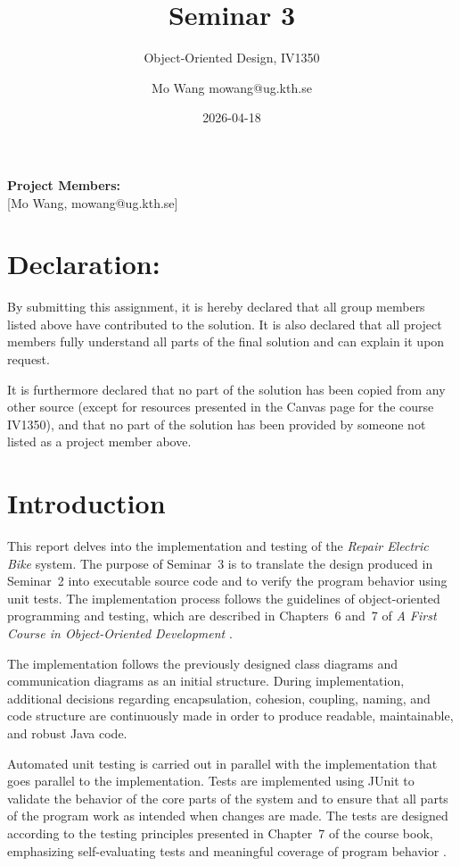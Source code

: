 \documentclass[a4paper]{scrartcl}
\title{Seminar 3}
\subtitle{Object-Oriented Design, IV1350}
\author{Mo Wang mowang@ug.kth.se}
\date{2026-04-18}
\begin{document}
\maketitle
\noindent\textbf{Project Members:} \\ \hfill
[Mo Wang, mowang@ug.kth.se]

\section*{Declaration:}

By submitting this assignment, it is hereby declared that all group members listed above have contributed to the solution. It is also declared that all project members fully understand all parts of the final solution and can explain it upon request.

It is furthermore declared that no part of the solution has been copied from any other source (except for resources presented in the Canvas page for the course IV1350), and that no part of the solution has been provided by someone not listed as a project member above.

\section{Introduction}
\label{sec:intro}

This report delves into the implementation and testing of the \textit{Repair Electric Bike} system. The purpose of Seminar~3 is to translate the design produced in Seminar~2 into executable source code and to verify the program behavior using unit tests. The implementation process follows the guidelines of object-oriented programming and testing, which are described in Chapters~6 and~7 of \textit{A First Course in Object-Oriented Development} \cite{coursebook}.

The implementation follows the previously designed class diagrams and communication diagrams as an initial structure. During implementation, additional decisions regarding encapsulation, cohesion, coupling, naming, and code structure are continuously made in order to produce readable, maintainable, and robust Java code.

Automated unit testing is carried out in parallel with the implementation that goes parallel to the implementation. Tests are implemented using JUnit to validate the behavior of the core parts of the system and to ensure that all parts of the program work as intended when changes are made. The tests are designed according to the testing principles presented in Chapter~7 of the course book, emphasizing self-evaluating tests and meaningful coverage of program behavior \cite{coursebook}.
\end{document}
